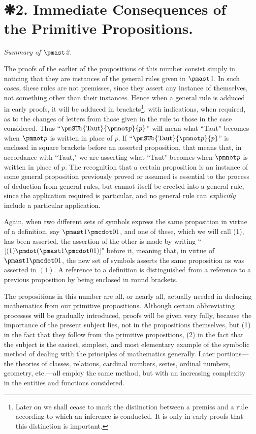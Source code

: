 \chapter*{❋2. Immediate Consequences of the Primitive Propositions.} %
 \textit{Summary of $\pmast$2.}

The proofs of the earlier of the propositions of this number consist simply in noticing that they are instances of the general rules given in $\pmast$1. In such cases, these rules are not premisses, since they assert any instance of themselves, not something other than their instances. Hence when a general rule is adduced in early proofs, it will be adduced in brackets\footnote{Later on we shall cease to mark the distinction between a premiss and a rule according to which an inference is conducted. It is only in early proofs that this distinction is important.}, with indications, when required, as to the changes of letters from those given in the rule to those in the case considered. Thus ``$\pmSUb{\text{Taut}}{\pmnot p}{p}$'' will mean what ``Taut'' becomes when $\pmnot p$ is written in place of $p$. If ``$\pmSUb{\text{Taut}}{\pmnot p}{p}$'' is enclosed in square brackets before an asserted proposition, that means that, in accordance with ``Taut," we are asserting what ``Taut" becomes when $\pmnot p$ is written in place of $p$. The recognition that a certain proposition is an instance of some general proposition previously proved or assumed is essential to the process of deduction from general rules, but cannot itself be erected into a general rule, since the application required is particular, and no general rule can \textit{explicitly} include a particular application.

Again, when two different sets of symbols express the same proposition in virtue of a definition, say $\pmast1\pmcdot01$, and one of these, which we will call (1), has been asserted, the assertion of the other is made by writing ``$[(1)\pmdot(\pmast1\pmcdot01)]$" before it, meaning that, in virtue of $\pmast1\pmcdot01$, the new set of symbols asserts the same proposition as was asserted in $(1)$. A reference to a definition is distinguished from a reference to a previous proposition by being enclosed in round brackets.

The propositions in this number are all, or nearly all, actually needed in deducing mathematics from our primitive propositions. Although certain abbreviating processes will be gradually introduced, proofs will be given very fully, because the importance of the present subject lies, not in the propositions themselves, but (1) in the fact that they follow from the primitive propositions, (2) in the fact that the subject is the easiest, simplest, and most elementary example of the symbolic method of dealing with the principles of mathematics generally. Later portions---the theories of classes, relations, cardinal numbers, series, ordinal numbers, geometry, etc.---all employ the same method, but with an increasing complexity in the entities and functions considered.


